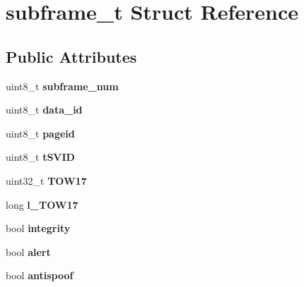 \hypertarget{structsubframe__t}{\section{subframe\-\_\-t \-Struct \-Reference}
\label{structsubframe__t}
}
\subsection*{\-Public \-Attributes}
\begin{DoxyCompactItemize}
\item 
\hypertarget{structsubframe__t_a7c0a86c242f4a0060af29f11c03482dc}{uint8\-\_\-t {\bfseries subframe\-\_\-num}}\label{structsubframe__t_a7c0a86c242f4a0060af29f11c03482dc}

\item 
\hypertarget{structsubframe__t_a3e1f0d6f5c7ad5badcf09042aa4f1462}{uint8\-\_\-t {\bfseries data\-\_\-id}}\label{structsubframe__t_a3e1f0d6f5c7ad5badcf09042aa4f1462}

\item 
\hypertarget{structsubframe__t_aeae97069f7b3304184d5b8002b870704}{uint8\-\_\-t {\bfseries pageid}}\label{structsubframe__t_aeae97069f7b3304184d5b8002b870704}

\item 
\hypertarget{structsubframe__t_a8648baa10327a894be4d607ef322f6ae}{uint8\-\_\-t {\bfseries t\-S\-V\-I\-D}}\label{structsubframe__t_a8648baa10327a894be4d607ef322f6ae}

\item 
\hypertarget{structsubframe__t_a9af2becbe3977367cfa51c5053f59b85}{uint32\-\_\-t {\bfseries \-T\-O\-W17}}\label{structsubframe__t_a9af2becbe3977367cfa51c5053f59b85}

\item 
\hypertarget{structsubframe__t_a671dd7ac338cba2edb8dd3b059403f7b}{long {\bfseries l\-\_\-\-T\-O\-W17}}\label{structsubframe__t_a671dd7ac338cba2edb8dd3b059403f7b}

\item 
\hypertarget{structsubframe__t_aceb6da3681965daa551597e7e6b5dcc6}{bool {\bfseries integrity}}\label{structsubframe__t_aceb6da3681965daa551597e7e6b5dcc6}

\item 
\hypertarget{structsubframe__t_a765f8819fda81058c8de1176f6b0983b}{bool {\bfseries alert}}\label{structsubframe__t_a765f8819fda81058c8de1176f6b0983b}

\item 
\hypertarget{structsubframe__t_a4bc4406e930fe79963d33466e21e99a6}{bool {\bfseries antispoof}}\label{structsubframe__t_a4bc4406e930fe79963d33466e21e99a6}


\end{DoxyCompactItemize}
